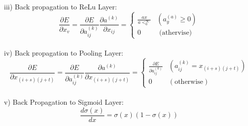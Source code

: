\documentclass[12pt]{revtex4}
\begin{document}
\\iii) Back propagation to ReLu Layer:
\begin{equation}\frac{\partial E}{\partial x_{v}}=\frac{\partial E}{\partial a_{i j}^{(k)}} \frac{\partial a^{(k)}}{\partial x_{i j}}=\left\{\begin{array}{ll}
\frac{a x}{a<_{0}^{\infty}} & \left(a_{y}^{(a)} \geq 0\right) \\
0 & \text { (athervise) }
\end{array}\right.\end{equation}
\\iv) Back propagation to Pooling Layer: 
\begin{equation}\frac{\partial E}{\partial x_{(i+s)(j+t)}}=\frac{\partial E}{\partial a_{i j}^{(k)}} \frac{\partial a^{(k)}}{\partial x_{(i+s)(j+t)}}=\left\{\begin{array}{ll}
\frac{\partial E}{\partial a_{i j}^{(k)}} & \left(a_{i j}^{(k)}=x_{(i+s)(j+t)}\right) \\
0 & (\text {otherwise})
\end{array}\right.\end{equation}
\\v) Back Propagation to Sigmoid Layer: 
\begin{equation}\frac{d \sigma(x)}{d x}=\sigma(x)(1-\sigma(x))\end{equation}



\pagebreak
\end{document}
